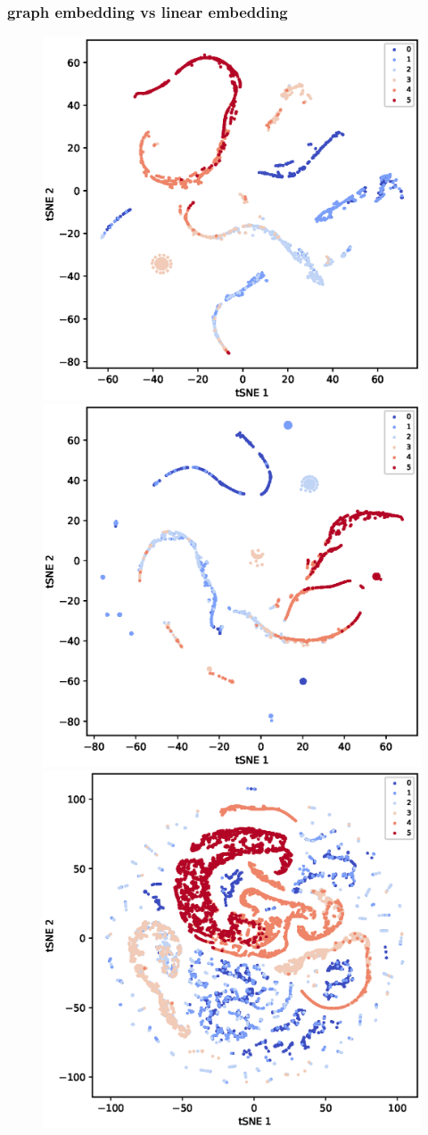 \documentclass[sigconf]{acmart}
\begin{document}
\subsubsection{graph embedding vs linear embedding}





  \begin{figure}[h]
  \centering
  \begin{center}
  \hspace*{-1in}
      \includegraphics[width=0.36\linewidth]{fig/Cora_1to3_tSNE.eps}
      \includegraphics[width=0.36\linewidth]{fig/Citeseer_1to3_tSNE.eps}
      \includegraphics[width=0.36\linewidth]{fig/PubMed_1to3_tSNE.eps}
      \hspace*{-1in}


\end{center}
\end{figure}
\end{document}
